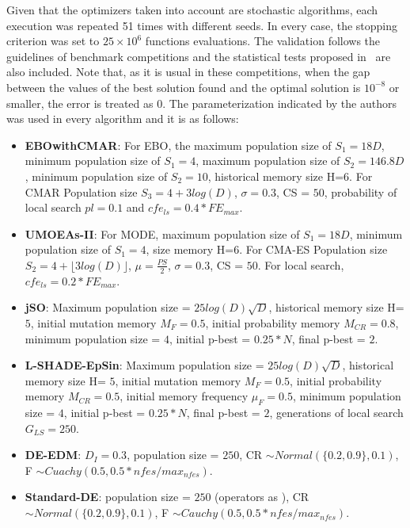 Given that the optimizers taken into account are stochastic algorithms, each execution was repeated 51 times with different seeds.
%
In every case, the stopping criterion was set to $25 \times 10^6$ functions evaluations.
%
The validation follows the guidelines of \CEC{} benchmark competitions and the statistical tests proposed in~\cite{Joel:StatisticalTest} are also included.
%
%
%
Note that, as it is usual in these competitions, when the gap between the values of the best solution found and the optimal solution is $10^{-8}$ or smaller, 
the error is treated as $0$.
%
%
The parameterization indicated by the authors was used in every algorithm and it is as follows:
\begin{itemize}
\item \textbf{EBOwithCMAR}: For EBO, the maximum population size of $S_1 = 18D$, minimum population size of $S_1 = 4$, maximum population size of $S_2 = 146.8D$, minimum population size of $S_2 = 10$, historical memory size H=$6$. For CMAR Population size $S_3 = 4 + 3log(D)$, $\sigma=0.3$, CS = $50$, probability of local search $pl = 0.1$ and $cfe_{ls} = 0.4* FE_{max}$.
\item \textbf{UMOEAs-II}: For MODE, maximum population size of $S_1 = 18D$, minimum population size of $S_1 = 4$, size memory H=$6$. For CMA-ES Population size $S_2 = 4 + \lfloor 3log(D) \rfloor$, $\mu=\frac{PS}{2}$, $\sigma=0.3$, CS = $50$. For local search, $cfe_{ls} = 0.2 * FE_{max}$.
\item \textbf{jSO}: Maximum population size = $25log(D)\sqrt{D}$, historical memory size H= $5$, initial mutation memory $M_F = 0.5$, initial probability memory $M_{CR} = 0.8$, minimum population size = $4$, initial p-best = $0.25*N$, final p-best = $2$.
\item \textbf{L-SHADE-EpSin}: Maximum population size = $25log(D)\sqrt{D}$, historical memory size H= $5$, initial mutation memory $M_F = 0.5$, initial probability memory $M_{CR} = 0.5$, initial memory frequency $\mu_F = 0.5$, minimum population size = $4$, initial p-best = $0.25*N$, final p-best = $2$, generations of local search $G_{LS}=250$.
\item \textbf{ DE-EDM}: $D_I = 0.3$, population size = $250$, CR $\sim Normal( \{0.2, 0.9\}, 0.1)$, F $\sim Cuachy(0.5, 0.5*nfes/max_{nfes})$.
\item \textbf{ Standard-DE}: population size = $250$ (operators as \DEEDM{}), CR $\sim Normal( \{0.2, 0.9\}, 0.1)$, F $\sim Cauchy(0.5, 0.5*nfes/max_{nfes})$.
\end{itemize}
%

